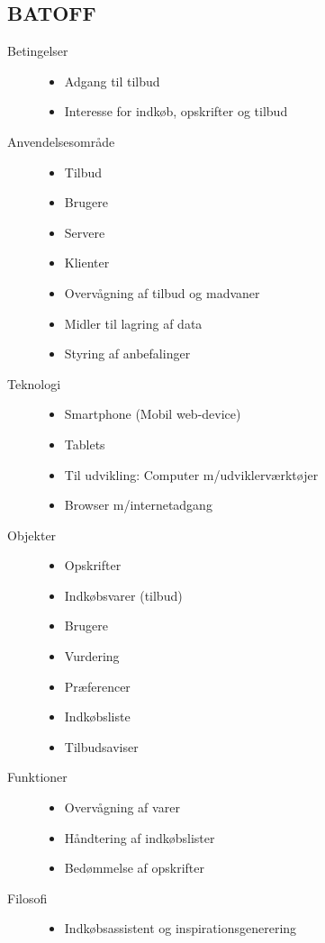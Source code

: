 \subsection{BATOFF}
\begin{description}
\item [Betingelser]\hfill
\begin{itemize}[nolistsep,noitemsep]
\item Adgang til tilbud
\item Interesse for indkøb, opskrifter og tilbud
\end{itemize}

\item [Anvendelsesområde]\hfill
\begin{itemize}[nolistsep,noitemsep]
\item Tilbud
\item Brugere
\item Servere
\item Klienter
\item Overvågning af tilbud og madvaner
\item Midler til lagring af data
\item Styring af anbefalinger
\end{itemize}

\item [Teknologi]\hfill
\begin{itemize}[nolistsep,noitemsep]
\item Smartphone (Mobil web-device)
\item Tablets
\item Til udvikling: Computer m/udviklerværktøjer
\item Browser m/internetadgang
\end{itemize}

\item [Objekter]\hfill
\begin{itemize}[nolistsep,noitemsep]
\item Opskrifter
\item Indkøbsvarer (tilbud)
\item Brugere
\item Vurdering
\item Præferencer
\item Indkøbsliste
\item Tilbudsaviser
\end{itemize}

\item [Funktioner]\hfill
\begin{itemize}[nolistsep,noitemsep]
\item Overvågning af varer
\item Håndtering af indkøbslister
\item Bedømmelse af opskrifter
\end{itemize}

\item [Filosofi]\hfill
\begin{itemize}[nolistsep,noitemsep]
\item Indkøbsassistent og inspirationsgenerering
\end{itemize}
\end{description}
